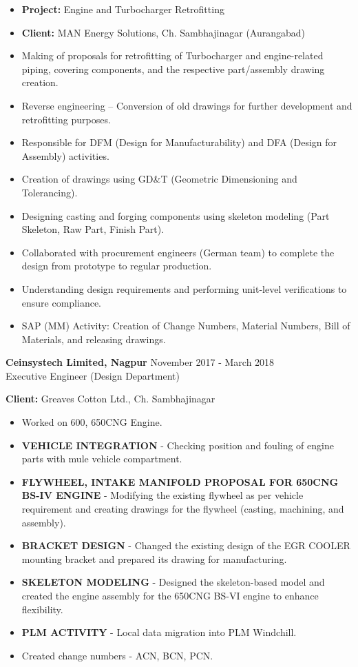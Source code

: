 \documentclass[letterpaper]{twentysecondcv} %
\begin{document}
\begin{itemize}
    \item \textbf{Project:} Engine and Turbocharger Retrofitting
    \item \textbf{Client:} MAN Energy Solutions, Ch. Sambhajinagar (Aurangabad)
    \item Making of proposals for retrofitting of Turbocharger and engine-related piping, covering components, and the respective part/assembly drawing creation.
    \item Reverse engineering – Conversion of old drawings for further development and retrofitting purposes.
    \item Responsible for DFM (Design for Manufacturability) and DFA (Design for Assembly) activities.
    \item Creation of drawings using GD\&T (Geometric Dimensioning and Tolerancing).
    \item Designing casting and forging components using skeleton modeling (Part Skeleton, Raw Part, Finish Part).
    \item Collaborated with procurement engineers (German team) to complete the design from prototype to regular production.
    \item Understanding design requirements and performing unit-level verifications to ensure compliance.
    \item {SAP (MM) Activity:} Creation of Change Numbers, Material Numbers, Bill of Materials, and releasing drawings.
\end{itemize}
\vspace{10pt}
\textbf{Ceinsystech Limited, Nagpur} \hfill November 2017 - March 2018  \\
Executive Engineer (Design Department) 
\item \textbf{Client:} Greaves Cotton Ltd., Ch. Sambhajinagar
\begin{itemize}
    \item Worked on 600, 650CNG Engine.
    \item \textbf{VEHICLE INTEGRATION} - Checking position and fouling of engine parts with mule vehicle compartment.
    \item \textbf{FLYWHEEL, INTAKE MANIFOLD PROPOSAL FOR 650CNG BS-IV ENGINE} - Modifying the existing flywheel as per vehicle requirement and creating drawings for the flywheel (casting, machining, and assembly).
    \item \textbf{BRACKET DESIGN} - Changed the existing design of the EGR COOLER mounting bracket and prepared its drawing for manufacturing.
    \item \textbf{SKELETON MODELING} - Designed the skeleton-based model and created the engine assembly for the 650CNG BS-VI engine to enhance flexibility.
    \item \textbf{PLM ACTIVITY} - Local data migration into PLM Windchill.
    \item Created change numbers - ACN, BCN, PCN.
\end{itemize}
\newpage
\vspace*{0.5cm}
\end{document}
